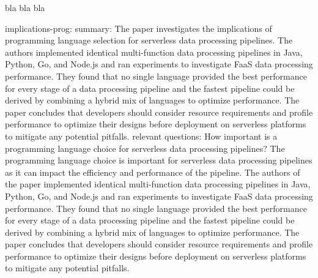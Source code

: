 bla bla bla ~\cite{implications-prog}

implications-prog:
summary:
The paper investigates the implications of programming language selection for serverless data processing pipelines. The authors implemented identical multi-function data processing pipelines in Java, Python, Go, and Node.js and ran experiments to investigate FaaS data processing performance. They found that no single language provided the best performance for every stage of a data processing pipeline and the fastest pipeline could be derived by combining a hybrid mix of languages to optimize performance. The paper concludes that developers should consider resource requirements and profile performance to optimize their designs before deployment on serverless platforms to mitigate any potential pitfalls.
relevant questions:
How important is a programming language choice for serverless data processing pipelines?
The programming language choice is important for serverless data processing pipelines as it can impact the efficiency and performance of the pipeline. The authors of the paper implemented identical multi-function data processing pipelines in Java, Python, Go, and Node.js and ran experiments to investigate FaaS data processing performance. They found that no single language provided the best performance for every stage of a data processing pipeline and the fastest pipeline could be derived by combining a hybrid mix of languages to optimize performance. The paper concludes that developers should consider resource requirements and profile performance to optimize their designs before deployment on serverless platforms to mitigate any potential pitfalls.
